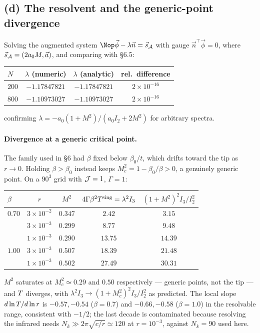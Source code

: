 \subsection{(d) The resolvent and the generic-point divergence}
Solving the augmented system $\Nop\vec\phi-\lambda\vec n=\vec s_{\Ac}$ with gauge
$\vec n^{\top}\vec\phi=0$, where $\vec s_{\mathcal{A}}=(2a_0M,\vec a)$, and comparing with \S6.5:
\begin{center}
\begin{tabular}{lccc}
\hline
$N$ & $\lambda$ (numeric) & $\lambda$ (analytic) & rel.\ difference\\
\hline
$200$ & $-1.17847821$ & $-1.17847821$ & $2\times10^{-16}$\\
$800$ & $-1.10973027$ & $-1.10973027$ & $2\times10^{-16}$\\
\hline
\end{tabular}
\end{center}
confirming $\lambda=-a_0(1+M^{2})/(a_0I_2+2M^{2})$ for arbitrary spectra.

\paragraph{Divergence at a generic critical point.} The family used in \S6 had $\beta$
fixed below $\beta_0/t$, which drifts toward the tip as $r\to0$. Holding $\beta>\beta_0$
instead keeps $M_c^{2}=1-\beta_0/\beta>0$, a genuinely generic point. On a $90^{3}$ grid
with $\mathcal{J}=1$, $\Gamma=1$:
\begin{center}
\begin{tabular}{lcccc}
\hline
$\beta$ & $r$ & $M^{2}$ & $4\Gamma\beta^{2}T^{\rm sing}=\lambda^{2}I_3$ & $(1+M^{2})^{2}I_3/I_2^{2}$\\
\hline
$0.70$ & $3\times10^{-2}$ & $0.347$ & $2.42$  & $3.15$\\
       & $3\times10^{-3}$ & $0.299$ & $8.77$  & $9.48$\\
       & $1\times10^{-3}$ & $0.290$ & $13.75$ & $14.39$\\[2pt]
$1.00$ & $3\times10^{-3}$ & $0.507$ & $18.39$ & $21.48$\\
       & $1\times10^{-3}$ & $0.502$ & $27.49$ & $30.31$\\
\hline
\end{tabular}
\end{center}
$M^{2}$ saturates at $M_c^{2}\simeq0.29$ and $0.50$ respectively --- generic points, not the
tip --- and $T$ diverges, with $\lambda^{2}I_3\to(1+M_c^{2})^{2}I_3/I_2^{2}$ as predicted.
The local slope $d\ln T/d\ln r$ is $-0.57,-0.54$ ($\beta=0.7$) and $-0.66,-0.58$
($\beta=1.0$) in the resolvable range, consistent with $-1/2$; the last decade is
contaminated because resolving the infrared needs
$N_k\gg2\pi\sqrt{c/r}\simeq120$ at $r=10^{-3}$, against $N_k=90$ used here.

